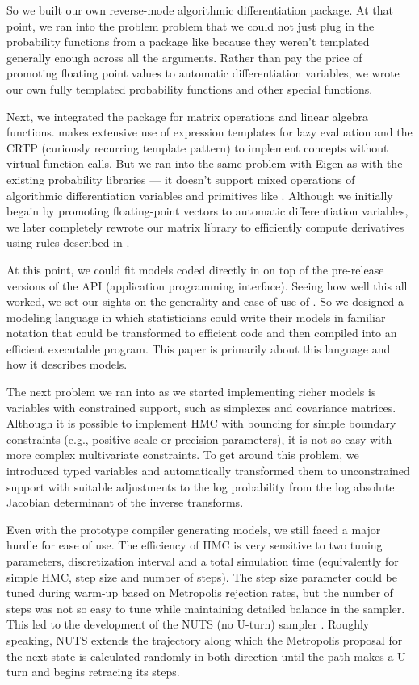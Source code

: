 \documentclass[article]{jss}
\begin{document}
So we built our own reverse-mode algorithmic differentiation package.
At that point, we ran into the problem problem that we could not just
plug in the probability functions from a package like  because
they weren't templated generally enough across all the arguments.
Rather than pay the price of promoting floating point values to
automatic differentiation variables, we wrote our own fully templated
probability functions and other special functions.

Next, we integrated the  package  for matrix
operations and linear algebra functions.   makes extensive use of
expression templates for lazy evaluation and the CRTP (curiously
recurring template pattern) to implement concepts without virtual
function calls.  But we ran into the same problem with Eigen as with
the existing probability libraries --- it doesn't support mixed
operations of algorithmic differentiation variables and primitives
like .  Although we initially begain by promoting
floating-point vectors to automatic differentiation variables, we
later completely rewrote our matrix library to efficiently compute
derivatives using rules described in \citep{Giles:2008,Griewank:2008}.

At this point, we could fit models coded directly in  on
top of the pre-release versions of the  API
(application programming interface).  Seeing how well this all worked,
we set our sights on the generality and ease of use of
.  So we designed a modeling language in which
statisticians could write their models in familiar notation that could
be transformed to efficient  code and then compiled into
an efficient executable program.  This paper is primarily about this
language and how it describes models.
 
The next problem we ran into as we started implementing richer models
is variables with constrained support, such as simplexes and
covariance matrices.  Although it is possible to implement HMC with
bouncing for simple boundary constraints (e.g., positive scale or
precision parameters), it is not so easy with more complex
multivariate constraints.  To get around this problem, we introduced
typed variables and automatically transformed them to unconstrained
support with suitable adjustments to the log probability from the log
absolute Jacobian determinant of the inverse transforms.

Even with the prototype compiler generating models, we still faced a
major hurdle for ease of use. The efficiency of HMC is very sensitive
to two tuning parameters, discretization interval and a total
simulation time (equivalently for simple HMC, step size and number of
steps).  The step size parameter could be tuned during warm-up based
on Metropolis rejection rates, but the number of steps was not so easy
to tune while maintaining detailed balance in the sampler.  This led
to the development of the NUTS (no U-turn) sampler
\citep{HoffmanGelman:2011}.  Roughly speaking, NUTS extends the
trajectory along which the Metropolis proposal for the next state is
calculated randomly in both direction until the path makes a U-turn
and begins retracing its steps.
\end{document}
